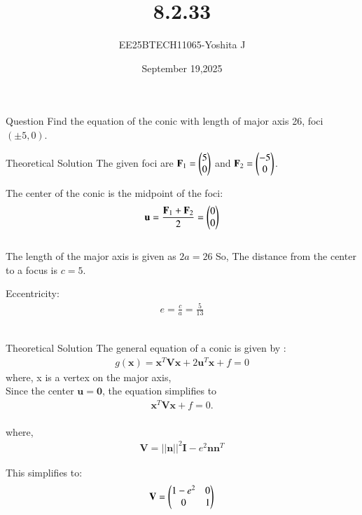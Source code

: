 \documentclass{beamer}
\begin{document}
\title 
{8.2.33}
\date{September 19,2025}


\author 
{EE25BTECH11065-Yoshita J}






\frame{\titlepage}
\begin{frame}{Question}
Find the equation of the conic with length of major axis 26, foci $(\pm 5, 0)$.

\end{frame}


\begin{frame}{Theoretical Solution}
The given foci are $\mathbf{F}_1 = \begin{pmatrix}5 \\ 0\end{pmatrix}$ and $\mathbf{F}_2 = \begin{pmatrix}-5 \\ 0\end{pmatrix}$.


The center of the conic is the midpoint of the foci:
\begin{align}
    \mathbf{u} = \frac{\mathbf{F}_1 + \mathbf{F}_2}{2} = \begin{pmatrix}0 \\ 0\end{pmatrix}
\end{align}
\\

The length of the major axis is given as $2a = 26$
So, The distance from the center to a focus is $c=5$.

Eccentricity:
\begin{align}
    e = \frac{c}{a} = \frac{5}{13}
\end{align}
\\

\end{frame}

\begin{frame}{Theoretical Solution}
The general equation of a conic is given by :
\begin{align}
    g(\mathbf{x}) = \mathbf{x}^T\mathbf{V}\mathbf{x} + 2\mathbf{u}^T\mathbf{x} + f = 0
\end{align}
where, x is a vertex on the major axis, 
\\
Since the center $\mathbf{u}=\mathbf{0}$, the equation simplifies to
\begin{align}
\mathbf{x}^T\mathbf{V}\mathbf{x} + f = 0.
\end{align}
\\
where,
\begin{align}
    \mathbf{V} = ||\mathbf{n}||^2 \mathbf{I} - e^2\mathbf{n}\mathbf{n}^T
\end{align}

This simplifies to:
\begin{align}
    \mathbf{V} = \begin{pmatrix}1-e^2 & 0 \\ 0 & 1\end{pmatrix}
\end{align}

\end{frame}
\end{document}
